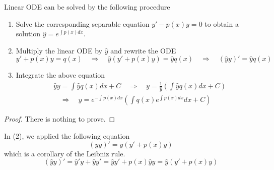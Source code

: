 \begin{theorem}[]\label{th.linear_ODE}
    Linear ODE can be solved by the following procedure
    \begin{enumerate}
        \item Solve the corresponding separable equation $y' - p(x)y = 0$ to obtain a solution $\hat{y} = e^{\int p(x)dx}$.
        \item Multiply the linear ODE by $\hat{y}$ and rewrite the ODE
        \begin{equation*}
            y' + p(x)y = q(x)
            \quad\Rightarrow\quad 
            \hat{y}(y' + p(x)y) = \hat{y}q(x)
            \quad\Rightarrow\quad 
            (\hat{y}y)' = \hat{y}q(x)
        \end{equation*}
        \item Integrate the above equation 
        \begin{equation*}
            \begin{split}
                &\hat{y}y = \int \hat{y}q(x) dx + C
                \quad\Rightarrow\quad 
                y = \frac{1}{\hat{y}}\left(\int \hat{y}q(x) dx +  C\right)
                \\
                &
                \quad \Rightarrow \quad
                y = e^{-\int p(x)dx}\left(\int q(x)e^{\int p(x)dx} dx+C\right)
            \end{split}
        \end{equation*}
    \end{enumerate}
\end{theorem}
\begin{proof}
    There is nothing to prove.
\end{proof}
\begin{remark}[]
    In (2), we applied the following equation
    \begin{equation*}
        (\hat{y}y)' = \hat{y}(y' + p(x)y) 
    \end{equation*} 
    which is a corollary of the Leibniz rule.
    \begin{equation*}
        (\hat{y}y)' = \hat{y}'y + \hat{y}y' = \hat{y}y' + p(x) \hat{y} y = \hat{y}(y' + p(x)y) 
    \end{equation*}
\end{remark}

